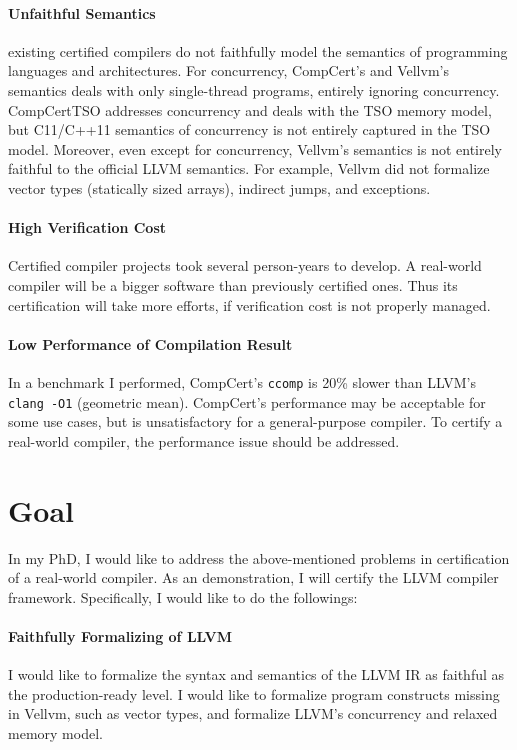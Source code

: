 \documentclass[nocopyrightspace]{sigplanconf}
\begin{document}
\paragraph{Unfaithful Semantics}
existing certified compilers do not faithfully model the semantics of
programming languages and architectures.  For concurrency, CompCert's
and Vellvm's semantics deals with only single-thread programs,
entirely ignoring concurrency.  CompCertTSO addresses concurrency and
deals with the TSO memory model, but C11/C++11 semantics of
concurrency is not entirely captured in the TSO model.  Moreover, even
except for concurrency, Vellvm's semantics is not entirely faithful to
the official LLVM semantics.  For example, Vellvm did not formalize
vector types (statically sized arrays), indirect jumps, and
exceptions.

\paragraph{High Verification Cost}
Certified compiler projects took several person-years to develop.  A
real-world compiler will be a bigger software than previously
certified ones.  Thus its certification will take more efforts, if
verification cost is not properly managed.

\paragraph{Low Performance of Compilation Result}
In a benchmark I performed, CompCert's \texttt{ccomp} is 20\% slower
than LLVM's \texttt{clang -O1} (geometric mean).  CompCert's
performance may be acceptable for some use cases, but is
unsatisfactory for a general-purpose compiler.  To certify a
real-world compiler, the performance issue should be addressed.

\section{Goal}

In my PhD, I would like to address the above-mentioned problems in
certification of a real-world compiler.  As an demonstration, I will
certify the LLVM compiler framework.  Specifically, I would like to do
the followings:

\paragraph{Faithfully Formalizing of LLVM}
I would like to formalize the syntax and semantics of the LLVM IR as
faithful as the production-ready level.  I would like to formalize
program constructs missing in Vellvm, such as vector types, and
formalize LLVM's concurrency and relaxed memory model.
\end{document}
